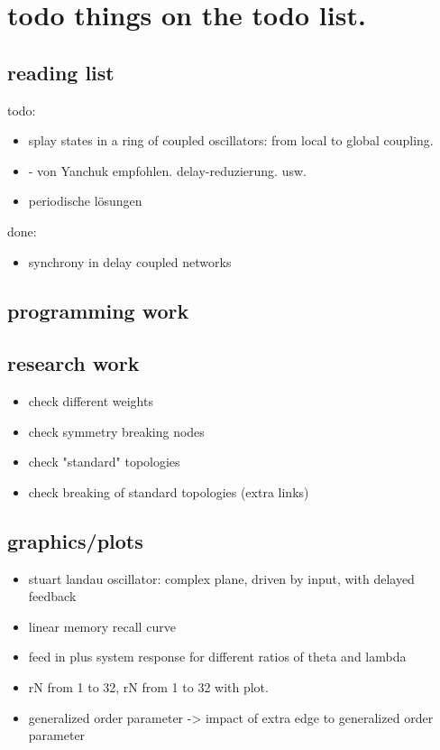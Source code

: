 \section{todo things on the todo list.}

\subsection{reading list}
	todo:
	\begin{itemize}
		\item \cite{ZOU09b} splay states in a ring of coupled oscillators: from local to global coupling.
		\item \cite{YAN11, POP11, KLI17, PAD13, LUE13b} - von Yanchuk empfohlen. delay-reduzierung. usw.
		\item \cite{YAN09} periodische lösungen
	\end{itemize}
	
	done:
	\begin{itemize}
		\item \cite{EAR03, CHO09, YEU99} synchrony in delay coupled networks
	\end{itemize}
	

\subsection{programming work}

\subsection{research work}
\begin{itemize}
    \item check different weights
    \item check symmetry breaking nodes
    \item check "standard" topologies
    \item check breaking of standard topologies (extra links)
\end{itemize}

\subsection{graphics/plots}
\begin{itemize}
	\item stuart landau oscillator: complex plane, driven by input, with delayed feedback
	\item linear memory recall curve
    \item feed in plus system response for different ratios of theta and lambda
    \item rN from 1 to 32, rN from 1 to 32 with plot.
    \item generalized order parameter -> impact of extra edge to generalized order parameter
    
\end{itemize}


